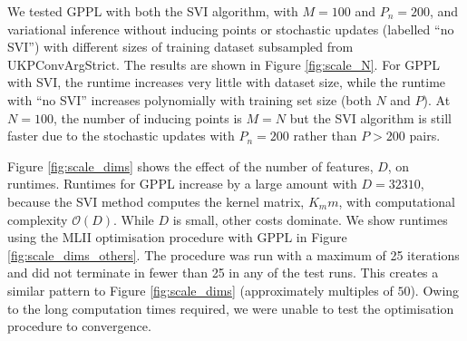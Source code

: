 We tested GPPL with both the SVI algorithm, with $M=100$ and $P_n=200$, and variational inference without inducing points or stochastic updates (labelled ``no SVI'') with different sizes of training dataset subsampled from UKPConvArgStrict. 
The results are shown in Figure \ref{fig:scale_N}.
For GPPL with SVI, the runtime increases very little with dataset size,
while the runtime with ``no SVI'' increases polynomially with training set size (both $N$ and $P$).
At $N=100$, the number of inducing points is $M=N$ but the SVI algorithm is still faster due to the stochastic updates with $P_n=200$ rather than $P>200$ pairs.

Figure \ref{fig:scale_dims} shows
the effect of the number of features, $D$, on runtimes.  
Runtimes for GPPL increase by a large amount with $D=32310$,
 because the SVI method computes the kernel matrix, $K_mm$, with computational complexity $\mathcal{O}(D)$. While $D$ is small, other
costs dominate.
We show runtimes using the MLII optimisation procedure with GPPL in Figure \ref{fig:scale_dims_others}. 
The procedure was run with a maximum of 25 iterations
and did not terminate in fewer than 25 in any of the test runs. 
This creates a similar pattern to Figure \ref{fig:scale_dims} (approximately multiples of $50$).
Owing to the long computation times required, we were unable to test the optimisation
procedure to convergence. 

